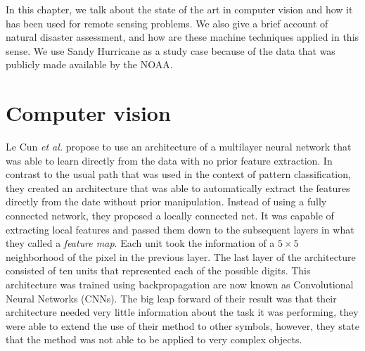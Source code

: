 In this chapter, we talk about the state of the art in computer vision and how it has been used for remote sensing problems. We also give a brief account of natural disaster assessment, and how are these machine techniques applied in this sense. We use Sandy Hurricane as a study case because of the data that was publicly made available by the NOAA.\\

\section{Computer vision}

Le Cun \textit{et al.} \cite{119325} propose to use an architecture of a multilayer neural network that was able to learn directly from the data with no prior feature extraction. In contrast to the usual path that was used in the context of pattern classification, they created an architecture that was able to automatically extract the features directly from the date without prior manipulation. Instead of using a fully connected network, they proposed a locally connected net. It was capable of extracting local features and passed them down to the subsequent layers in what they called a \textit{feature map}. Each unit took the information of a $5\times 5$ neighborhood of the pixel in the previous layer. The last layer of the architecture consisted of ten units that represented each of the possible digits. This architecture was trained using backpropagation are now known as Convolutional Neural Networks (CNNs). The big leap forward of their result was that their architecture needed very little information about the task it was performing, they were able to extend the use of their method to other symbols, however, they state that the method was not able to be applied to very complex objects.\\

